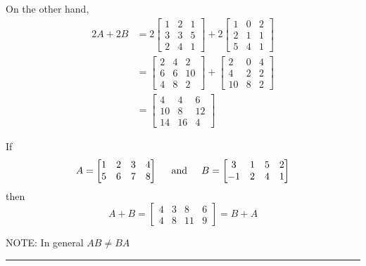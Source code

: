 \begin{enumerate}
\begin{example}
 On the other hand, 
  \begin{align*}
  2A+2B  &=  2 \begin{bmatrix}  1& 2& 1\\ 3 & 3 & 5 \\ 2  &  4  &  1 \end{bmatrix}+ 2 \begin{bmatrix}  1& 0& 2\\ 2 & 1 &  1 \\ 5  &  4  &  1 \end{bmatrix}  \\
  &=   \begin{bmatrix}  2& 4& 2\\ 6 & 6 & 10 \\ 4  &  8  &  2 \end{bmatrix}+  \begin{bmatrix}  2& 0& 4\\ 4 & 2 &  2 \\ 10  &  8  &  2 \end{bmatrix} \\
  &= \begin{bmatrix} 4 & 4  &6 \\ 10 & 8 & 12 \\ 14  &  16  &  4  \end{bmatrix}
 \end{align*}
\end{example}




\begin{example} If
$$ A = \begin{bmatrix}  1& 2& 3 & 4\\ 5 & 6 & 7  & 8 \end{bmatrix} \text{\;\;\;\; and \;\;\;\;} B = \begin{bmatrix}  3& 1& 5 & 2\\ -1 & 2 & 4  & 1 \end{bmatrix}$$ 
then
 $$ A+B = \begin{bmatrix}  4& 3& 8 & 6\\ 4 & 8 & 11  & 9 \end{bmatrix} = B+A$$ 


\end{example}




NOTE:  In general $AB \ne BA$

\rule[0.01in]{\textwidth}{0.0025in}


\end{enumerate}
